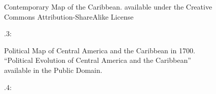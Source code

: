 \begin{figure}
{\caption{\label{fig:key:3}.3:}}{  Contemporary} Map of the Caribbean. \citet{Kmusser2011} available under the Creative Commons Attribution-ShareAlike License

 
 
\end{figure}

\begin{figure}

 

{\caption{\label{fig:key:3}.4:}}{} Political Map of Central America and the Caribbean in 1700. \citet{Esemono2009} “Political Evolution of Central America and the Caribbean” available in the Public Domain.
\end{figure}

